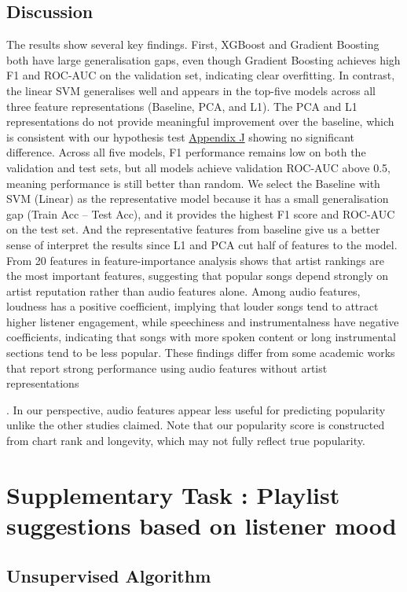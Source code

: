 \documentclass{article}
\begin{document}
{{{\subsection{Discussion}
The results show several key findings. First, XGBoost and Gradient Boosting both have large generalisation gaps, even though Gradient Boosting achieves high F1 and ROC-AUC on the validation set, indicating clear overfitting. In contrast, the linear SVM generalises well and appears in the top-five models across all three feature representations (Baseline, PCA, and L1). The PCA and L1 representations do not provide meaningful improvement over the baseline, which is consistent with our hypothesis test
\hyperref[tab:Hypothesis]{Appendix J} showing no significant difference. Across all five models, F1 performance remains low on both the validation and test sets, but all models achieve validation ROC-AUC above 0.5, meaning performance is still better than random. We select the Baseline with SVM (Linear) as the representative model because it has a small generalisation gap (Train Acc – Test Acc), and it provides the highest F1 score and ROC-AUC on the test set. And the representative features from baseline give us a better sense of interpret the results since L1 and PCA cut half of features to the model. From 20 features in feature-importance analysis shows that artist rankings are the most important features, suggesting that popular songs depend strongly on artist reputation rather than audio features alone. Among audio features, loudness has a positive coefficient, implying that louder songs tend to attract higher listener engagement, while speechiness and instrumentalness have negative coefficients, indicating that songs with more spoken content or long instrumental sections tend to be less popular. These findings differ from some academic works that report strong performance using audio features without artist representations{\cite{ref1}{\cite{ref2}{\cite{ref6}{\cite{PhamEtAl2015}. In our perspective, audio features appear less useful for predicting popularity unlike the other studies claimed. Note that our popularity score is constructed from chart rank and longevity, which may not fully reflect true popularity.


\section{Supplementary Task : Playlist suggestions based on listener mood}
\subsection{Unsupervised Algorithm}


}}}}}}}
\end{document}
